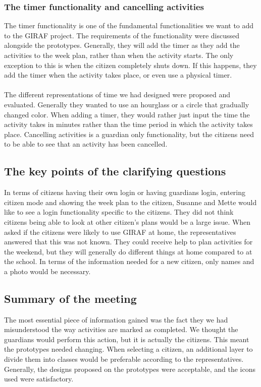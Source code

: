 \subsubsection{The timer functionality and cancelling activities}
The timer functionality is one of the fundamental functionalities we want to add to the GIRAF project.
The requirements of the functionality were discussed alongside the prototypes.
Generally, they will add the timer as they add the activities to the week plan, rather than when the activity starts.
The only exception to this is when the citizen completely shuts down.
If this happens, they add the timer when the activity takes place, or even use a physical timer.
\\\\
The different representations of time we had designed were proposed and evaluated.
Generally they wanted to use an hourglass or a circle that gradually changed color.
When adding a timer, they would rather just input the time the activity takes in minutes rather than the time period in which the activity takes place.
Cancelling activities is a guardian only functionality, but the citizens need to be able to see that an activity has been cancelled.

\subsection{The key points of the clarifying questions}
In terms of citizens having their own login or having guardians login, entering citizen mode and showing the week plan to the citizen, Susanne and Mette would like to see a login functionality specific to the citizens.
They did not think citizens being able to look at other citizen's plans would be a large issue.
When asked if the citizens were likely to use GIRAF at home, the representatives answered that this was not known.
They could receive help to plan activities for the weekend, but they will generally do different things at home compared to at the school.
In terms of the information needed for a new citizen, only names and a photo would be necessary.

\subsection{Summary of the meeting}
The most essential piece of information gained was the fact they we had misunderstood the way activities are marked as completed.
We thought the guardians would perform this action, but it is actually the citizens.
This meant the prototypes needed changing.
When selecting a citizen, an additional layer to divide them into classes would be preferable according to the representatives.
Generally, the designs proposed on the prototypes were acceptable, and the icons used were satisfactory.
